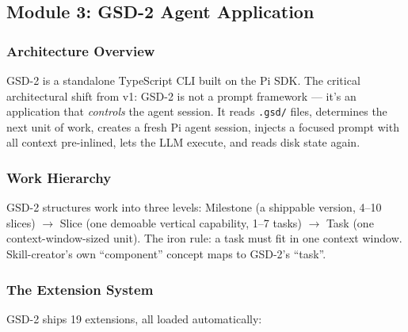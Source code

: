 \documentclass[11pt,letterpaper]{article}
\begin{document}
\subsection{Module 3: GSD-2 Agent Application}

\subsubsection{Architecture Overview}

GSD-2 is a standalone TypeScript CLI built on the Pi SDK. The critical architectural shift from v1: GSD-2 is not a prompt framework --- it's an application that \emph{controls} the agent session. It reads \texttt{.gsd/} files, determines the next unit of work, creates a fresh Pi agent session, injects a focused prompt with all context pre-inlined, lets the LLM execute, and reads disk state again.

\subsubsection{Work Hierarchy}

GSD-2 structures work into three levels: Milestone (a shippable version, 4--10 slices) $\rightarrow$ Slice (one demoable vertical capability, 1--7 tasks) $\rightarrow$ Task (one context-window-sized unit). The iron rule: a task must fit in one context window. Skill-creator's own ``component'' concept maps to GSD-2's ``task''.

\subsubsection{The Extension System}

GSD-2 ships 19 extensions, all loaded automatically:
\end{document}
